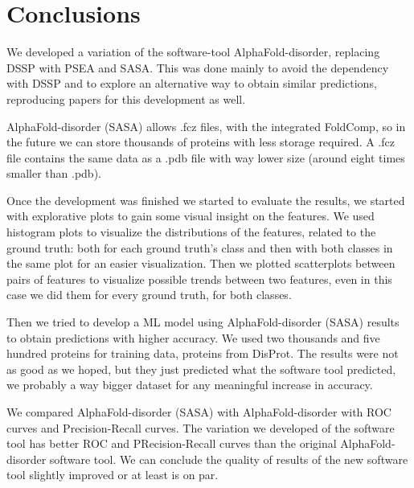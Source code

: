 \chapter{Conclusions}
\label{chp:conclusions}
We developed a variation of the software-tool AlphaFold-disorder, replacing DSSP with PSEA and SASA. This was done mainly to avoid the dependency with DSSP and to explore an alternative way to obtain similar predictions, reproducing papers for this development as well. 

AlphaFold-disorder (SASA) allows .fcz files, with the integrated FoldComp, so in the future we can store thousands of proteins with less storage required. A .fcz file contains the same data as a .pdb file with way lower size (around eight times smaller than .pdb).

Once the development was finished we started to evaluate the results, we started with explorative plots to gain some visual insight on the features. We used histogram plots to visualize the distributions of the features, related to the ground truth: both for each ground truth's class and then with both classes in the same plot for an easier visualization.
Then we  plotted scatterplots between pairs of features to visualize possible trends between two features, even in this case we did them for every ground truth, for both classes. 

Then we tried to develop a ML model using AlphaFold-disorder (SASA) results to obtain predictions with higher accuracy. We used two thousands and five hundred proteins for training data, proteins from DisProt. The results were not as good as we hoped, but they just predicted what the software tool predicted, we probably a way bigger dataset for any meaningful increase in accuracy.

\pagebreak

We compared AlphaFold-disorder (SASA) with AlphaFold-disorder with ROC curves and Precision-Recall curves. The variation we developed of the software tool has better ROC and PRecision-Recall curves than the original AlphaFold-disorder software tool. We can conclude the quality of results of the new software tool slightly improved or at least is on par.
